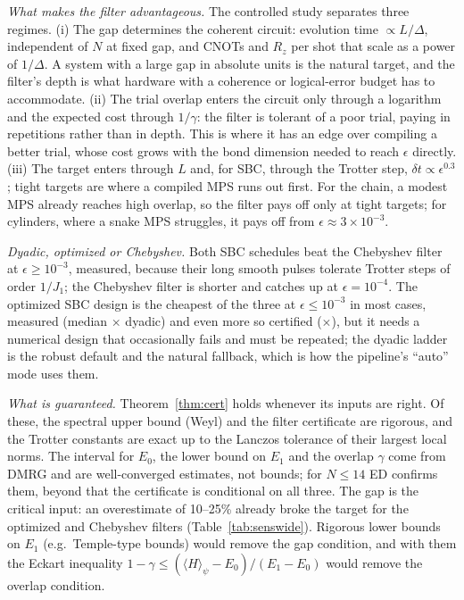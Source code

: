 \documentclass[aps,pra,twocolumn,superscriptaddress,nofootinbib]{revtex4-2}
\begin{document}
\emph{What makes the filter advantageous.} The controlled study separates three regimes. (i) The gap
determines the coherent circuit: evolution time $\propto L/\Delta$, independent of $N$ at fixed gap, and
CNOTs and $R_z$ per shot that scale as a power of $1/\Delta$. A system with a large gap in absolute units is
the natural target, and the filter's depth is what hardware with a coherence or logical-error budget has to
accommodate. (ii) The trial overlap enters the circuit only through a logarithm and the expected cost through
$1/\gamma$: the filter is tolerant of a poor trial, paying in repetitions rather than in depth. This is
where it has an edge over compiling a better trial, whose cost grows with the bond dimension needed to
reach $\epsilon$ directly. (iii) The target enters through $L$ and, for SBC, through the Trotter step,
$\delta t\propto\epsilon^{0.3}$; tight targets are where a compiled MPS runs out first. For the chain, a
modest MPS already reaches high overlap, so the filter pays off only at tight targets; for cylinders, where a
snake MPS struggles, it pays off from $\epsilon\approx3\times10^{-3}$.

\emph{Dyadic, optimized or Chebyshev.} Both SBC schedules beat the Chebyshev filter at
$\epsilon\ge10^{-3}$, measured, because their long smooth pulses tolerate Trotter steps of order $1/J_1$;
the Chebyshev filter is shorter and catches up at $\epsilon=10^{-4}$. The optimized SBC design is the cheapest of the three at
$\epsilon\le10^{-3}$ in most cases, measured (median \odMMed$\times$ dyadic) and even more so certified
(\odCMed$\times$), but it needs a numerical design that occasionally fails and must be repeated; the dyadic
ladder is the robust default and the natural fallback, which is how the pipeline's ``auto'' mode uses
them.

\emph{What is guaranteed.} Theorem~\ref{thm:cert} holds whenever its inputs are right. Of these, the
spectral upper bound (Weyl) and the filter certificate are rigorous, and the Trotter constants are exact up to
the Lanczos tolerance of their largest local norms. The interval for $E_0$, the lower bound on $E_1$ and the
overlap $\gamma$ come from DMRG and are well-converged estimates, not bounds; for $N\le14$ ED confirms them,
beyond that the certificate is conditional on all three. The gap is the critical input: an overestimate of
10--25\% already broke the target for the optimized and Chebyshev filters (Table~\ref{tab:senswide}).
Rigorous lower bounds on $E_1$ (e.g.\ Temple-type bounds) would remove the gap condition, and with them the
Eckart inequality $1-\gamma\le(\langle H\rangle_\psi-E_0)/(E_1-E_0)$ would remove the overlap condition.
\end{document}
